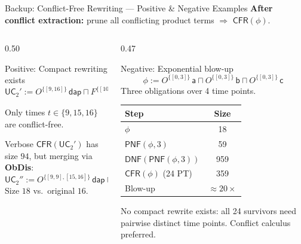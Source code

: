 \documentclass[9pt,aspectratio=169]{beamer}
\newcommand{\pnf}{\ensuremath{\mathsf{PNF}}}
\newcommand{\dnf}{\ensuremath{\mathsf{DNF}}}
\newcommand{\Namb}{\ensuremath{\mathsf{CFR}}\xspace}
\newcommand{\delAtGate}{\ensuremath{\mathsf{dag}}\xspace}
\newcommand{\delAtPark}{\ensuremath{\mathsf{dap}}\xspace}
\newcommand{\SR}{\ensuremath{\mathsf{SR}}\xspace}
\newcommand{\MA}{\ensuremath{\mathsf{MA}}\xspace}
\newcommand{\UC}{\ensuremath{\mathsf{UC}}\xspace}
\newcommand{\ob}[2]{\ensuremath{O^{#1}\,#2}}
\newcommand{\forbb}[2]{\ensuremath{F^{#1}\,#2}}
\begin{document}
\begin{frame}{Backup: Conflict-Free Rewriting — Positive \& Negative Examples}
\small
\textbf{After conflict extraction:} prune all conflicting product terms $\Rightarrow$ $\Namb(\phi)$.

\medskip
\begin{columns}[T]
\begin{column}{0.50\textwidth}
  \begin{block}{\textcolor{ConflictGreen}{Positive: Compact rewriting exists}}
    \[
    \UC_2' := \ob{\{[9,16]\}}{\delAtPark} \sqcap \underbrace{\forbb{\{[10,14]\}}{\delAtPark}}_{\SR}
    \sqcap \underbrace{\forbb{\{[2,4],[8,24]\}}{\delAtGate}}_{\MA}
    \]
    Only times $t\!\in\!\{9,15,16\}$ are conflict-free.

    Verbose $\Namb(\UC_2')$ has size $94$, but merging via \textbf{ObDis}:
    \[
    \UC_2'' := \ob{\{[9,9],[15,16]\}}{\delAtPark} \sqcap \SR \sqcap \MA
    \]
    Size $18$ vs.\ original $16$. {\color{ConflictGreen}\checkmark}
  \end{block}
\end{column}
\begin{column}{0.47\textwidth}
  \begin{block}{\textcolor{ConflictRed}{Negative: Exponential blow-up}}
    \[
    \phi := \ob{\{[0,3]\}}{\mathsf{a}} \sqcap \ob{\{[0,3]\}}{\mathsf{b}} \sqcap \ob{\{[0,3]\}}{\mathsf{c}}
    \]
    Three obligations over 4 time points.
    \vspace{1mm}
    \begin{center}
    \renewcommand{\arraystretch}{1.2}
    \begin{tabular}{lc}
    \hline
    \textbf{Step} & \textbf{Size} \\\hline
    $\phi$ & 18 \\
    $\pnf(\phi,3)$ & 59 \\
    $\dnf(\pnf(\phi,3))$ & 959 \\
    $\Namb(\phi)$ (24 PT) & 359 \\\hline
    Blow-up & $\approx 20\times$
    \end{tabular}
    \end{center}
    \vspace{1mm}
    No compact rewrite exists: all 24 survivors need pairwise distinct time points. {\color{ConflictRed}Conflict calculus preferred.}
  \end{block}
\end{column}
\end{columns}
\end{frame}
\end{document}

